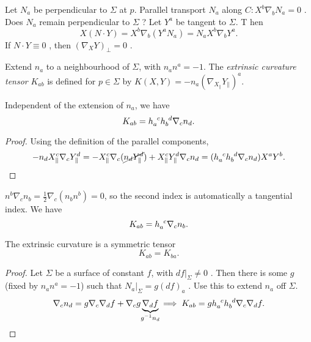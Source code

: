 Let $N_a$  be perpendicular to $\Sigma$  at $p$.
Parallel transport  $N_a$  along $C \colon X^{b} \nabla_{b} N_{a} = 0$ .
Does $N_a$  remain perpendicular to $\Sigma$ ?
Let $Y^{a}$  be tangent to $\Sigma$. T hen
\begin{equation}
  X(N \cdot Y) = X^{b} \nabla_b (Y^{a} N_a) = N_{a} X^{b} \nabla_b Y^{a}.
\end{equation}
If $N \cdot Y \equiv 0$ , then $(\nabla_X Y)_{\perp} = 0$ .

\begin{definition}
  Extend $n_a$ to a neighbourhood of $\Sigma$, with $n_a n^a = -1$.
  The \emph{extrinsic curvature tensor} $K_{ab}$ is defined for $p \in \Sigma$ by $K(X, Y) = -n_a (\nabla_{X_\parallel} Y_{\parallel})^{a}$.
\end{definition}

\begin{lemma}
  Independent of the extension of $n_a$, we have
  \begin{equation}
    K_{ab} = h\indices{_{a}^{c}} h\indices{_{b}^{d}} \nabla_c n_d.
  \end{equation}
\end{lemma}
\begin{proof}
  Using the definition of the parallel components, 
  \begin{equation}
    -n_d X^{c}_\parallel \nabla_c Y^{d}_\parallel = -X^{c}_\parallel \nabla_c (\cancel{n_d Y_\parallel^d}) + X^{c}_\parallel Y_\parallel^{d} \nabla_c n_d = (h\indices{_{a}^{c}} h\indices{_{b}^{d}} \nabla_c n_d) X^{a} Y^{b}.
  \end{equation}
\end{proof}
\begin{remark}
  $n^{b} \nabla_c n_b = \frac{1}{2} \nabla_c (n_b n^b) = 0$, so the second index is automatically a tangential index.
  We have
  \begin{equation}
    K_{ab} = h\indices{_{a}^{c}} \nabla_c n_b.
  \end{equation}
\end{remark}

\begin{lemma}
  The extrinsic curvature is a symmetric tensor
  \begin{equation}
    K_{ab} = K_{ba}.
  \end{equation}
\end{lemma}
\begin{proof}
  Let $\Sigma$  be a surface of constant $f$, with $df\rvert_\Sigma \neq 0$ .
  Then there is some $g$ (fixed by $n_a n^a = -1$) such that $N_a \rvert_{\Sigma} = g(df)_a$ .
  Use this to extend $n_a$  off $\Sigma$.
   \begin{equation}
    \nabla_c n_d = g \nabla_c \nabla_d f + \nabla_c g \underbrace{\nabla_d f}_{\mathclap{g^{-1} n_d}} \implies K_{ab} = g h\indices{_{a}^{c}} h\indices{_{b}^{d}} \nabla_c \nabla_d f.
  \end{equation}
\end{proof}

